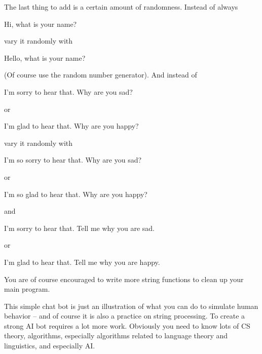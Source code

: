 The last thing to add is a certain amount of randomness.
Instead of always
\begin{console}[fontsize=\small,frame=single,commandchars=\\\{\}]
Hi, what is your name?
\end{console}
vary it randomly with
\begin{console}[fontsize=\small,frame=single,commandchars=\\\{\}]
Hello, what is your name?
\end{console}
(Of course use the random number generator).
And instead of
\begin{console}[fontsize=\small,frame=single,commandchars=\\\{\}]
I'm sorry to hear that. Why are you sad?
\end{console}
or
\begin{console}[fontsize=\small,frame=single,commandchars=\\\{\}]
I'm glad to hear that. Why are you happy?
\end{console}
vary it randomly with
\begin{console}[fontsize=\small,frame=single,commandchars=\\\{\}]
I'm so sorry to hear that. Why are you sad?
\end{console}
or
\begin{console}[fontsize=\small,frame=single,commandchars=\\\{\}]
I'm so glad to hear that. Why are you happy?
\end{console}
and
\begin{console}[fontsize=\small,frame=single,commandchars=\\\{\}]
I'm sorry to hear that. Tell me why you are sad.
\end{console}
or
\begin{console}[fontsize=\small,frame=single,commandchars=\\\{\}]
I'm glad to hear that. Tell me why you are happy.
\end{console}

You are of course encouraged to write more string functions
to clean up your main program.

This simple chat bot is just an illustration of
what you can do to simulate human behavior --
and of course it is also a practice on string processing.
To create a strong AI bot requires a lot more work.
Obviously you need to know lots of
CS theory, algorithms,
especially algorithms related to language theory and linguistics,
and especially AI.
